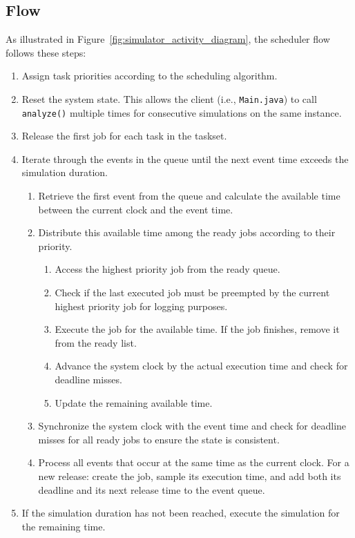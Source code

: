 \subsection{Flow}
As illustrated in Figure~\ref{fig:simulator_activity_diagram}, the scheduler flow follows these steps:
\begin{enumerate}
    \item Assign task priorities according to the scheduling algorithm.
    \item Reset the system state. This allows the client (i.e., \texttt{Main.java}) to call \texttt{analyze()} multiple times for consecutive simulations on the same instance.
    \item Release the first job for each task in the taskset.
    \item Iterate through the events in the queue until the next event time exceeds the simulation duration.
    \begin{enumerate}
        \item Retrieve the first event from the queue and calculate the available time between the current clock and the event time.
        \item Distribute this available time among the ready jobs according to their priority.
        \begin{enumerate}
            \item Access the highest priority job from the ready queue.
            \item Check if the last executed job must be preempted by the current highest priority job for logging purposes.
            \item Execute the job for the available time. If the job finishes, remove it from the ready list.
            \item Advance the system clock by the actual execution time and check for deadline misses.
            \item Update the remaining available time.
        \end{enumerate}
        \item Synchronize the system clock with the event time and check for deadline misses for all ready jobs to ensure the state is consistent.
        \item Process all events that occur at the same time as the current clock. For a new release: create the job, sample its execution time, and add both its deadline and its next release time to the event queue.
    \end{enumerate}
    \item If the simulation duration has not been reached, execute the simulation for the remaining time.
\end{enumerate}

